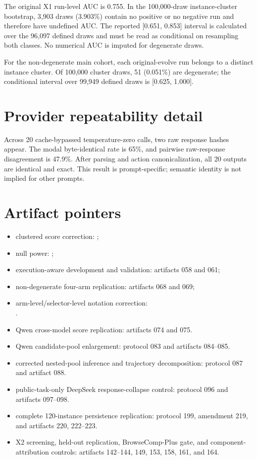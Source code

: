 The original X1 run-level AUC is 0.755. In the 100,000-draw instance-cluster bootstrap, 3,903 draws (3.903\%) contain no positive or no negative run and therefore have undefined AUC. The reported [0.651, 0.853] interval is calculated over the 96,097 defined draws and must be read as conditional on resampling both classes. No numerical AUC is imputed for degenerate draws.

For the non-degenerate main cohort, each original-evolve run belongs to a distinct instance cluster. Of 100,000 cluster draws, 51 (0.051\%) are degenerate; the conditional interval over 99,949 defined draws is [0.625, 1.000].

\section{Provider repeatability detail}

Across 20 cache-bypassed temperature-zero calls, two raw response hashes appear. The modal byte-identical rate is 65\%, and pairwise raw-response disagreement is 47.9\%. After parsing and action canonicalization, all 20 outputs are identical and exact. This result is prompt-specific; semantic identity is not implied for other prompts.

\section{Artifact pointers}

\begin{itemize}
  \item clustered score correction: ;
  \item null power: ;
  \item execution-aware development and validation: artifacts 058 and 061;
  \item non-degenerate four-arm replication: artifacts 068 and 069;
  \item arm-level/selector-level notation correction: \\
  .
  \item Qwen cross-model score replication: artifacts 074 and 075.
  \item Qwen candidate-pool enlargement: protocol 083 and artifacts 084--085.
  \item corrected nested-pool inference and trajectory decomposition: protocol 087 and artifact 088.
  \item public-task-only DeepSeek response-collapse control: protocol 096 and artifacts 097--098.
  \item complete 120-instance persistence replication: protocol 199, amendment 219, and artifacts 220, 222--223.
  \item X2 screening, held-out replication, BrowseComp-Plus gate, and component-attribution controls: artifacts 142--144, 149, 153, 158, 161, and 164.
\end{itemize}


